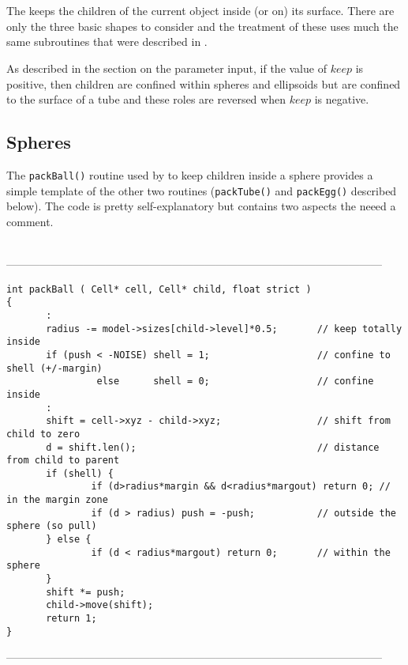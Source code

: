 \section{}

The  keeps the children of the current object inside (or on) its
surface.  There are only the three basic shapes to consider and the treatment
of these uses much the same subroutines that were described in .

As described in the section on the parameter input, if the value of $keep$
is positive, then children are confined within spheres and ellipsoids but
are confined to the surface of a tube and these roles are reversed when
$keep$ is negative.

\subsection{Spheres}

The {\tt packBall()} routine used by  to keep children inside a sphere
provides a simple template of the other two routines ({\tt packTube()} and {\tt packEgg()}
described below).    The code is pretty self-explanatory but contains two aspects the
neeed a comment.  
\begin{singlespace}
\ \\
------------------------------------------------------------------------------------------------------
\begin{tiny}
\begin{verbatim}
int packBall ( Cell* cell, Cell* child, float strict )
{
       :
       radius -= model->sizes[child->level]*0.5;       // keep totally inside
       if (push < -NOISE) shell = 1;                   // confine to shell (+/-margin)
                else      shell = 0;                   // confine inside
       :
       shift = cell->xyz - child->xyz;                 // shift from child to zero
       d = shift.len();                                // distance from child to parent
       if (shell) {
               if (d>radius*margin && d<radius*margout) return 0; // in the margin zone
               if (d > radius) push = -push;           // outside the sphere (so pull)
       } else {
               if (d < radius*margout) return 0;       // within the sphere
       }
       shift *= push;
       child->move(shift);
       return 1;
}
\end{verbatim}
\end{tiny}
------------------------------------------------------------------------------------------------------
\end{singlespace}

